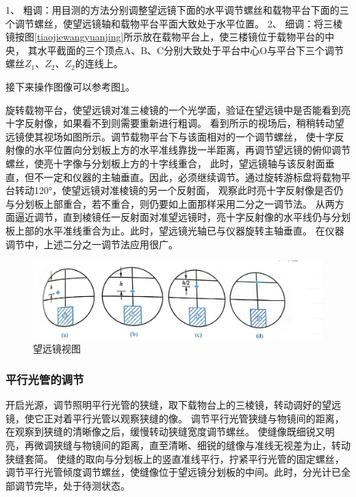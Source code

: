 \documentclass{ctexart}
\begin{document}
    1、 粗调：用目测的方法分别调整望远镜下面的水平调节螺丝和载物平台下面的三个调节螺丝，使望远镜轴和载物平台平面大致处于水平位置。
    2、 细调：将三棱镜按图\ref{tiaojiewangyuanjing}所示放在载物平台上，使三楼镜位于载物平台的中央，
    其水平截面的三个顶点A、B、C分别大致处于平台中心O与平台下三个调节螺丝$Z_{1}$、$Z_{2}$、$Z_{2}$的连线上。

    接下来操作图像可以参考图\ref{wangyuanjingshitu}。

    旋转载物平台，使望远镜对准三棱镜的一个光学面，验证在望远镜中是否能看到亮十字反射像，如果看不到则需要重新进行粗调。
    看到所示的视场后，稍稍转动望远镜使其视场如图所示。调节载物平台下与该面相对的一个调节螺丝，
    使十字反射像的水平位置向分划板上方的水平准线靠拢一半距离，再调节望远镜的俯仰调节螺丝，使亮十字像与分划板上方的十字线重合，
    此时，望远镜轴与该反射面垂直，但不一定和仪器的主轴垂直。因此，必须继续调节。通过旋转游标盘将载物平台转动120°，使望远镜对准棱镜的另一个反射面，
    观察此时亮十字反射像是否仍与分划板上部重合，若不重合，则仍要如上面那样采用二分之一调节法。
    从两方面逼近调节，直到棱镜任一反射面对准望远镜时，亮十字反射像的水平线仍与分划板上部的水平准线重合为止。此时，望远镜光轴已与仪器旋转主轴垂直。
    在仪器调节中，上述二分之一调节法应用很广。
    \begin{figure}[t]
      \centering
      \includegraphics[height=0.4\textwidth,width=1\textwidth]{wangyuanjingshitu.jpg}
      \caption{望远镜视图}\label{wangyuanjingshitu}
    \end{figure}

    \subsubsection{平行光管的调节}
    开启光源，调节照明平行光管的狭缝，取下载物台上的三棱镜，转动调好的望远镜，使它正对着平行光管以观察狭缝的像。
    调节平行光管狭缝与物镜间的距离，在观察到狭缝的清晰像之后，缓慢转动狭缝宽度调节螺丝。
    使缝像既细锐又明亮，再微调狭缝与物镜间的距离，直至清晰、细锐的缝像与准线无视差为止，转动狭缝套简。
    使缝的取向与分划板上的竖直准线平行，拧紧平行光管的固定螺丝，调节平行光管倾度调节螺丝，使缝像位于望远镜分划板的中间。此时，分光计已全部调节完毕，处于待测状态。
\end{document}
